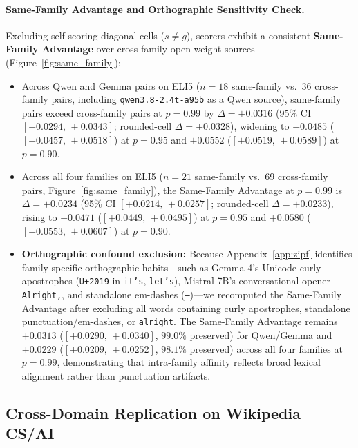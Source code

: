 \documentclass[11pt]{article}
\begin{document}
\paragraph{Same-Family Advantage and Orthographic Sensitivity Check.}
Excluding self-scoring diagonal cells ($s \neq g$), scorers exhibit a consistent \textbf{Same-Family Advantage} over cross-family open-weight sources (Figure~\ref{fig:same_family}):
\begin{itemize}
    \item Across Qwen and Gemma pairs on ELI5 ($n=18$ same-family vs.\ $36$ cross-family pairs, including \texttt{qwen3.8-2.4t-a95b} as a Qwen source), same-family pairs exceed cross-family pairs at $p=0.99$ by $\Delta = +0.0316$ (95\% CI $[+0.0294,\,+0.0343]$; rounded-cell $\Delta = +0.0328$), widening to $+0.0485$ ($[+0.0457,\,+0.0518]$) at $p=0.95$ and $+0.0552$ ($[+0.0519,\,+0.0589]$) at $p=0.90$.
    \item Across all four families on ELI5 ($n=21$ same-family vs.\ $69$ cross-family pairs, Figure~\ref{fig:same_family}), the Same-Family Advantage at $p=0.99$ is $\Delta = +0.0234$ (95\% CI $[+0.0214,\,+0.0257]$; rounded-cell $\Delta = +0.0233$), rising to $+0.0471$ ($[+0.0449,\,+0.0495]$) at $p=0.95$ and $+0.0580$ ($[+0.0553,\,+0.0607]$) at $p=0.90$.
    \item \textbf{Orthographic confound exclusion:} Because Appendix~\ref{app:zipf} identifies family-specific orthographic habits—such as Gemma 4's Unicode curly apostrophes (\texttt{U+2019} in \texttt{it's}, \texttt{let's}), Mistral-7B's conversational opener \texttt{Alright,}, and standalone em-dashes (\texttt{---})—we recomputed the Same-Family Advantage after excluding all words containing curly apostrophes, standalone punctuation/em-dashes, or \texttt{alright}. The Same-Family Advantage remains $+0.0313$ ($[+0.0290,\,+0.0340]$, $99.0\%$ preserved) for Qwen/Gemma and $+0.0229$ ($[+0.0209,\,+0.0252]$, $98.1\%$ preserved) across all four families at $p=0.99$, demonstrating that intra-family affinity reflects broad lexical alignment rather than punctuation artifacts.
\end{itemize}

\subsection{Cross-Domain Replication on Wikipedia CS/AI}
\end{document}
